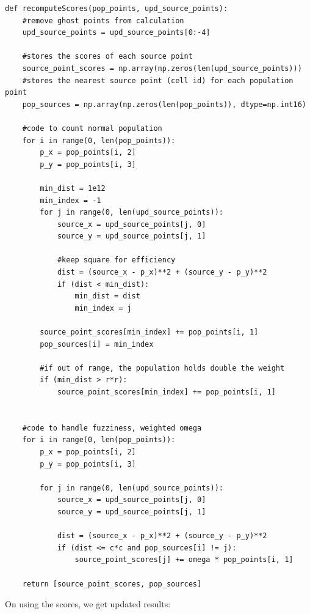 \documentclass{article}
\begin{document}
\begin{verbatim} 
def recomputeScores(pop_points, upd_source_points):
    #remove ghost points from calculation
    upd_source_points = upd_source_points[0:-4]
    
    #stores the scores of each source point
    source_point_scores = np.array(np.zeros(len(upd_source_points))) 
    #stores the nearest source point (cell id) for each population point
    pop_sources = np.array(np.zeros(len(pop_points)), dtype=np.int16)
    
    #code to count normal population
    for i in range(0, len(pop_points)):
        p_x = pop_points[i, 2]
        p_y = pop_points[i, 3]
        
        min_dist = 1e12
        min_index = -1
        for j in range(0, len(upd_source_points)):
            source_x = upd_source_points[j, 0]
            source_y = upd_source_points[j, 1]
        
            #keep square for efficiency
            dist = (source_x - p_x)**2 + (source_y - p_y)**2
            if (dist < min_dist):
                min_dist = dist
                min_index = j

        source_point_scores[min_index] += pop_points[i, 1]
        pop_sources[i] = min_index
        
        #if out of range, the population holds double the weight 
        if (min_dist > r*r):
            source_point_scores[min_index] += pop_points[i, 1]
    
    
    #code to handle fuzziness, weighted omega
    for i in range(0, len(pop_points)):
        p_x = pop_points[i, 2]
        p_y = pop_points[i, 3]
        
        for j in range(0, len(upd_source_points)):
            source_x = upd_source_points[j, 0]
            source_y = upd_source_points[j, 1]
            
            dist = (source_x - p_x)**2 + (source_y - p_y)**2
            if (dist <= c*c and pop_sources[i] != j):
                source_point_scores[j] += omega * pop_points[i, 1]
        
    return [source_point_scores, pop_sources]
\end{verbatim}

On using the scores, we get updated results: 
\end{document}
